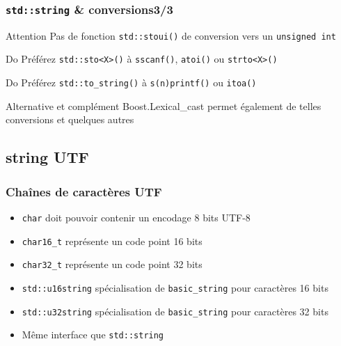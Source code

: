 \documentclass[C++.tex]{subfiles}
\begin{document}
\begin{frame}[fragile]
	\frametitle{\lstinline|std::string| \& conversions\titlehfill{}3/3}
	\begin{alertblock}{Attention}
		Pas de fonction \lstinline|std::stoui()| de conversion vers un \lstinline|unsigned int|
	\end{alertblock}

	\begin{exampleblock}{Do}
		Préférez \lstinline|std::sto<X>()| à \lstinline|sscanf()|, \lstinline|atoi()| ou \lstinline|strto<X>()|
	\end{exampleblock}

	\begin{exampleblock}{Do}
		Préférez \lstinline|std::to_string()| à \lstinline|s(n)printf()| ou \lstinline|itoa()|
	\end{exampleblock}

	\begin{block}{Alternative et complément}
		Boost.Lexical\_cast permet également de telles conversions et quelques autres
	\end{block}
\end{frame}

\subsection*{string UTF}
\begin{frame}[fragile]
	\frametitle{Chaînes de caractères UTF}
	\begin{itemize}
		\item \lstinline|char| doit pouvoir contenir un encodage 8 bits UTF-8


		\item \lstinline|char16_t| représente un code point 16 bits
		\item \lstinline|char32_t| représente un code point 32 bits
		\item \lstinline|std::u16string| spécialisation de \lstinline|basic_string| pour caractères 16 bits
		\item \lstinline|std::u32string| spécialisation de \lstinline|basic_string| pour caractères 32 bits
		\item Même interface que \lstinline|std::string|
	\end{itemize}
\end{frame}
\end{document}
